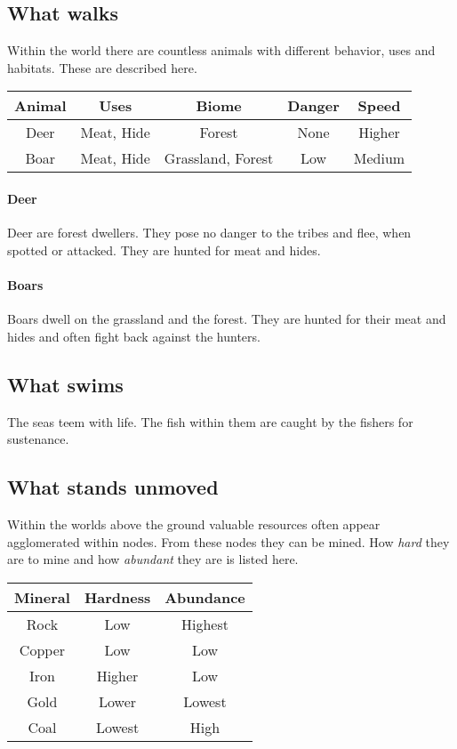 \subsection{What walks}\label{ch:Goods:Nature:Animals}
Within the world there are countless animals with different behavior, uses and
habitats. These are described here.

\begin{longtable}{ccccc}
	\toprule
	Animal & Uses       & Biome             & Danger & Speed  \\
	\midrule
	Deer   & Meat, Hide & Forest            & None   & Higher \\
	Boar   & Meat, Hide & Grassland, Forest & Low    & Medium \\
	\bottomrule
\end{longtable}

\paragraph{Deer}
Deer are forest dwellers. They pose no danger to the tribes and flee, when
spotted or attacked. They are hunted for meat and hides.

\paragraph{Boars}
Boars dwell on the grassland and the forest. They are hunted for their meat and
hides and often fight back against the hunters.

\subsection{What swims}\label{ch:Goods:Nature:Sea}
The seas teem with life. The fish within them are caught by the fishers for
sustenance.

\subsection{What stands unmoved}\label{ch:Goods:Nature:Minerals}
Within the worlds above the ground valuable resources often appear agglomerated
within nodes. From these nodes they can be mined. How \emph{hard} they are to
mine and how \emph{abundant} they are is listed here.

\begin{longtable}{ccc}
	\toprule
	Mineral & Hardness & Abundance \\
	\midrule
	Rock    & Low      & Highest   \\
	Copper  & Low      & Low       \\
	Iron    & Higher   & Low       \\
	Gold    & Lower    & Lowest    \\
	Coal    & Lowest   & High      \\
	\bottomrule
\end{longtable}

